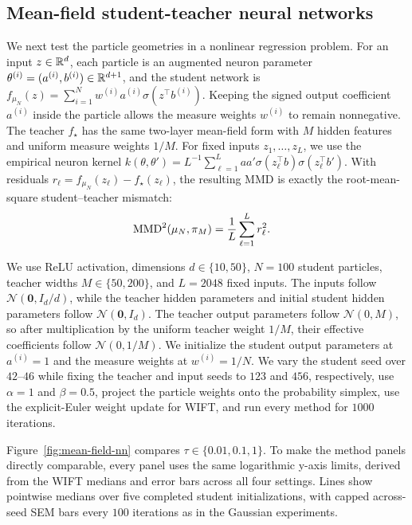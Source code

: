 \subsection{Mean-field student-teacher neural networks}
We next test the particle geometries in a nonlinear regression problem. For an input $z\in\mathbb{R}^d$, each particle is an augmented neuron parameter $\theta^{(i)}=(a^{(i)},b^{(i)})\in\mathbb{R}^{d+1}$, and the student network is $f_{\mu_N}(z)=\sum_{i=1}^N w^{(i)}a^{(i)}\sigma(z^\top b^{(i)})$. Keeping the signed output coefficient $a^{(i)}$ inside the particle allows the measure weights $w^{(i)}$ to remain nonnegative. The teacher $f_\star$ has the same two-layer mean-field form with $M$ hidden features and uniform measure weights $1/M$. For fixed inputs $z_1,\ldots,z_L$, we use the empirical neuron kernel $k(\theta,\theta')=L^{-1}\sum_{\ell=1}^L a a'\sigma(z_\ell^\top b)\sigma(z_\ell^\top b')$. With residuals $r_\ell=f_{\mu_N}(z_\ell)-f_\star(z_\ell)$, the resulting MMD is exactly the root-mean-square student--teacher mismatch:
\begin{align*}
    \operatorname{MMD}^2(\mu_N,\pi_M)
    &= \frac{1}{L}\sum_{\ell=1}^L r_\ell^2.
\end{align*}

We use ReLU activation, dimensions $d\in\{10,50\}$, $N=100$ student particles, teacher widths $M\in\{50,200\}$, and $L=2048$ fixed inputs. The inputs follow $\mathcal{N}(\bm{0},I_d/d)$, while the teacher hidden parameters and initial student hidden parameters follow $\mathcal{N}(\bm{0},I_d)$. The teacher output parameters follow $\mathcal{N}(0,M)$, so after multiplication by the uniform teacher weight $1/M$, their effective coefficients follow $\mathcal{N}(0,1/M)$. We initialize the student output parameters at $a^{(i)}=1$ and the measure weights at $w^{(i)}=1/N$. We vary the student seed over $42$--$46$ while fixing the teacher and input seeds to $123$ and $456$, respectively, use $\alpha=1$ and $\beta=0.5$, project the particle weights onto the probability simplex, use the explicit-Euler weight update for WIFT, and run every method for $1000$ iterations.

Figure~\ref{fig:mean-field-nn} compares $\tau\in\{0.01,0.1,1\}$. To make the method panels directly comparable, every panel uses the same logarithmic y-axis limits, derived from the WIFT medians and error bars across all four settings. Lines show pointwise medians over five completed student initializations, with capped across-seed SEM bars every $100$ iterations as in the Gaussian experiments.

